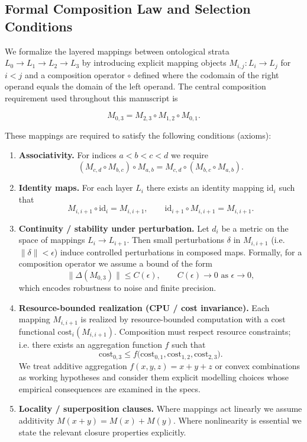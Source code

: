 \subsection*{Formal Composition Law and Selection Conditions}
\label{sec:composition-law}

We formalize the layered mappings between ontological strata $L_0\to L_1\to L_2\to L_3$ by
introducing explicit mapping objects $M_{i,j}:L_i\to L_j$ for $i<j$ and a composition operator $\circ$
defined where the codomain of the right operand equals the domain of the left operand. The central
composition requirement used throughout this manuscript is

\begin{equation}
M_{0,3} = M_{2,3}\circ M_{1,2}\circ M_{0,1}.
\end{equation}

These mappings are required to satisfy the following conditions (axioms):

\begin{enumerate}
\item \textbf{Associativity.} For indices $a<b<c<d$ we require
\[(M_{c,d}\circ M_{b,c})\circ M_{a,b} = M_{c,d}\circ (M_{b,c}\circ M_{a,b}).\]
\item \textbf{Identity maps.} For each layer $L_i$ there exists an identity mapping $\mathrm{id}_i$ such that
\[M_{i,i+1}\circ \mathrm{id}_i = M_{i,i+1},\qquad \mathrm{id}_{i+1}\circ M_{i,i+1} = M_{i,i+1}.
\]
\item \textbf{Continuity / stability under perturbation.} Let $d_i$ be a metric on the space of mappings
$L_i\to L_{i+1}$. Then small perturbations $\delta$ in $M_{i,i+1}$ (i.e. $\|\delta\|<\epsilon$) induce
controlled perturbations in composed maps. Formally, for a composition operator we assume a bound of the form
\[\|\Delta(M_{0,3})\| \le C(\epsilon),\qquad C(\epsilon)\to 0 \text{ as }\epsilon\to 0,\]
which encodes robustness to noise and finite precision.
\item \textbf{Resource-bounded realization (CPU / cost invariance).} Each mapping $M_{i,i+1}$ is realized by
resource-bounded computation with a cost functional $\mathrm{cost}_i(M_{i,i+1})$. Composition must respect
resource constraints; i.e. there exists an aggregation function $f$ such that
\[\mathrm{cost}_{0,3} \le f\big(\mathrm{cost}_{0,1},\mathrm{cost}_{1,2},\mathrm{cost}_{2,3}\big).
\]
We treat additive aggregation $f(x,y,z)=x+y+z$ or convex combinations as working hypotheses and
consider them explicit modelling choices whose empirical consequences are examined in the specs.
\item \textbf{Locality / superposition clauses.} Where mappings act linearly we assume additivity
$M(x+y)=M(x)+M(y)$. Where nonlinearity is essential we state the relevant closure properties explicitly.
\end{enumerate}

